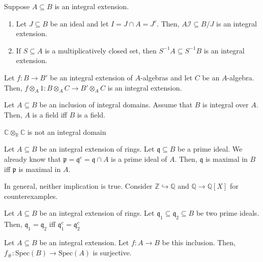 \documentclass[oneside, 12pt]{scrbook}
\newcommand{\CC}{\mathbb C}
\newcommand{\QQ}{\mathbb Q}
\newcommand{\RR}{\mathbb R}
\newcommand{\ZZ}{\mathbb Z}
\newcommand{\I}{\mathcal{I}}
\newcommand{\spec}{\mathrm{Spec}}
\newcommand{\pr}{\mathfrak{p}}
\theoremstyle{theorem}
\begin{document}
\begin{proposition}
Suppose $A \subseteq B$ is an integral extension. 
\begin{enumerate}
\item Let $J \subseteq B$ be an ideal and let $I = J \cap A = J^c$. Then, $A\I \subseteq B/J$ is an integral extension. 
\item If $S\subseteq A$ is a multiplicatively closed set, then $S^{-1}A \subseteq S^{-1}B$ is an integral extension.
\end{enumerate}
\end{proposition}

\begin{theorem}
Let $f: B \rightarrow B'$ be an integral extension of $A$-algebras and let $C$ be an $A$-algebra. Then, $f \otimes_{A} 1 : B \otimes_{A} C \rightarrow B' \otimes_{A} C$ is an integral extension.
\end{theorem}

\begin{proposition}
Let $A \subseteq B$ be an inclusion of integral domains. Assume that $B$ is integral over $A$. Then, $A$ is a field iff $B$ is a field.
\end{proposition}

\begin{corollary}
$\CC \otimes_{\RR} \CC$ is not an integral domain
\end{corollary}

\begin{corollary}
Let $A \subseteq B$ be an integral extension of rings. Let $\mathfrak{q} \subseteq B$ be a prime ideal. We already know that $\pr = \mathfrak{q}^c = \mathfrak{q}\cap A$ is a prime ideal of $A$. Then, $\mathfrak{q}$ is maximal in $B$ iff $\pr$ is maximal in $A$.
\end{corollary}

\begin{remark}
In general, neither implication is true. Consider $\ZZ \hookrightarrow \QQ$ and $\QQ \rightarrow \QQ[X]$ for counterexamples.
\end{remark}

\begin{corollary}
Let $A \subseteq B$ be an integral extension of rings. Let $\mathfrak{q}_{1} \subseteq \mathfrak{q}_{2} \subseteq B$ be two prime ideals. Then, $\mathfrak{q}_{1} = \mathfrak{q}_{2}$ iff $\mathfrak{q}_{1}^c = \mathfrak{q}_{2}^c$
\end{corollary}

\begin{theorem}
Let $A \subseteq B$ be an integral extension. Let $f: A \rightarrow B$ be this inclusion. Then, $f_{\#} : \spec(B) \rightarrow \spec(A)$ is surjective.
\end{theorem}
\end{document}
